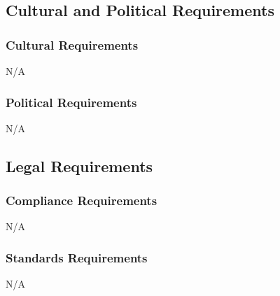 \documentclass[]{article}
\begin{document}
\subsection{Cultural and Political Requirements}
\label{sub:cultural_and_political_requirements}

\subsubsection{Cultural Requirements}
\label{ssub:cultural_requirements}
N/A

\subsubsection{Political Requirements}
\label{ssub:political_requirements}
N/A

\subsection{Legal Requirements}
\label{sub:legal_requirements}

\subsubsection{Compliance Requirements}
\label{ssub:compliance_requirements}
N/A

\subsubsection{Standards Requirements}
\label{ssub:standards_requirements}
N/A

\newpage
\appendix
\end{document}
